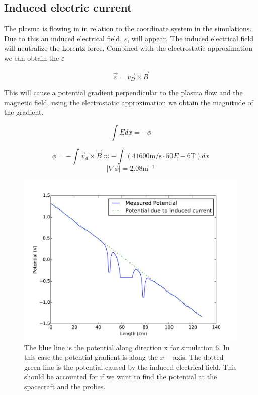 \subsection{Induced electric current}
	The plasma is flowing in in relation to the coordinate system in the simulations.
	Due to this an induced electrical field, \(\varepsilon\), will appear.
	The induced electrical field will neutralize the Lorentz force.
	Combined with the electrostatic approximation we can obtain the \(\varepsilon\)

	\begin{equation}
		\vec{\varepsilon} = \vec{v_D}\times \vec{B}
	\end{equation}

	This will cause a potential gradient perpendicular to the plasma flow and the magnetic field,
	using the electrostatic approximation we obtain the magnitude of the gradient.

	\begin{equation}
		\int{Edx} = -\phi
	\end{equation}

	\begin{equation}
		\phi = -\int \vec{v}_d\times\vec{B} \approx -\int \left( 41600 \text{m/s}\cdot 50E-6 \text{T} \right) dx
	\end{equation}
	\begin{equation}
		|\nabla\phi| = 2.08 \text{m}^{-1}
	\end{equation}

	\begin{figure}
		\includegraphics[width = \textwidth]{images/emph}
		\caption{The blue line is the potential along direction x for simulation \(6\). In this case the potential gradient is along
		the \(x-\)axis. The dotted green line is the potential caused by the induced electrical field. This should be accounted for
		if  we want to find the potential at the spacecraft and the probes.}
		\label{fig:emph}
	\end{figure}

